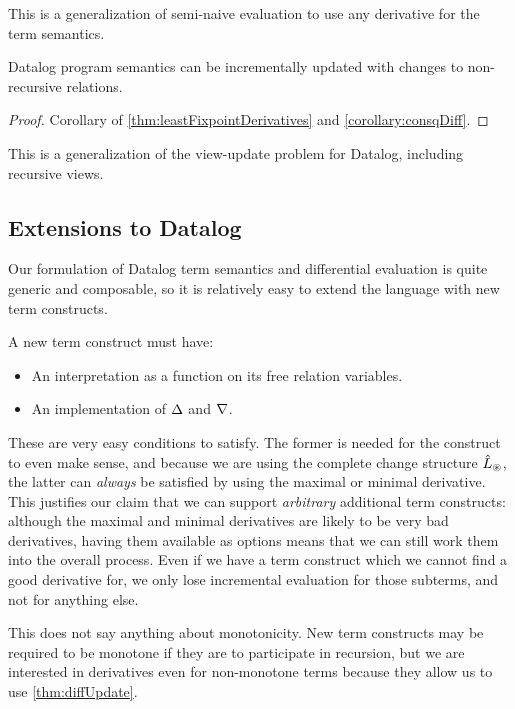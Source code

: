 This is a generalization of semi-naive evaluation to use any derivative for the
term semantics.

\begin{thm}
\label{thm:diffUpdate}
  Datalog program semantics can be incrementally updated with changes to non-recursive relations.
\end{thm}
\ifproofs
\begin{proof}
  Corollary of \cref{thm:leastFixpointDerivatives} and \cref{corollary:consqDiff}.
\end{proof}
\fi

This is a generalization of the view-update problem for Datalog, including recursive views.

\subsection{Extensions to Datalog}
\label{sec:extensions}

Our formulation of Datalog term semantics and differential evaluation is quite
generic and composable, so it is relatively easy to extend the language with new
term constructs.

A new term construct must have:
\begin{itemize}
  \item An interpretation as a function on its free relation variables.
  \item An implementation of $\Delta$ and $\nabla$.
\end{itemize}

These are very easy conditions to satisfy. The former is needed for the construct to even
make sense, and because we are using the complete change structure
$\hat{L}_\circledast$, the latter can \emph{always} be satisfied by using the maximal or
minimal derivative. This justifies our claim that we can support
\emph{arbitrary} additional term constructs: although the maximal and minimal
derivatives are likely to be very bad derivatives, having them
available as options means that we can still work them into the overall process.
Even if we have a term construct which we cannot find a good derivative for, we only lose incremental
evaluation for those subterms, and not for anything else.

This does not say anything about monotonicity. New term constructs may
be required to be monotone if they are to participate in recursion, but we are
interested in derivatives even for non-monotone terms because they allow us to
use \cref{thm:diffUpdate}.

